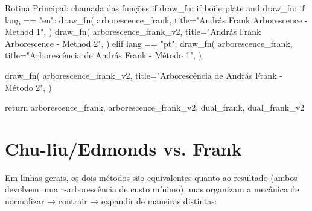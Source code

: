 \documentclass[12pt,a4paper]{article}
\begin{document}
\begin{pybox}{Rotina Principal: chamada das funções}
        if draw_fn:
            if boilerplate and draw_fn:
                if lang == "en":
                    draw_fn(
                        arborescence_frank,
                        title="András Frank Arborescence - Method 1",
                    )
                    draw_fn(
                        arborescence_frank_v2,
                        title="András Frank Arborescence - Method 2",
                    )
                elif lang == "pt":
                    draw_fn(
                        arborescence_frank,
                        title="Arborescência de András Frank - Método 1",
                    )

                    draw_fn(
                        arborescence_frank_v2,
                        title="Arborescência de András Frank - Método 2",
                    )

    return arborescence_frank, arborescence_frank_v2, dual_frank, dual_frank_v2
\end{pybox}    


\section{Chu-liu/Edmonds vs. Frank}

Em linhas gerais, os dois métodos são equivalentes quanto ao resultado (ambos devolvem uma r‑arborescência de custo mínimo), mas organizam a mecânica de normalizar → contrair → expandir de maneiras distintas:
\end{document}
